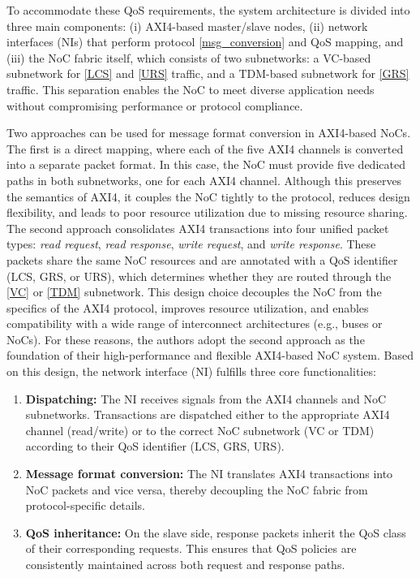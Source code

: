 To accommodate these QoS requirements, the system architecture is divided into three main components: (i) AXI4-based master/slave nodes, (ii) network interfaces (NIs) that perform protocol \ref{msg_conversion} and QoS mapping, and (iii) the NoC fabric itself, which consists of two subnetworks: a VC-based subnetwork for \ref{LCS} and \ref{URS} traffic, and a TDM-based subnetwork for \ref{GRS} traffic. 
This separation enables the NoC to meet diverse application needs without compromising performance or protocol compliance.


\label{msg_conversion}
Two approaches can be used for message format conversion in AXI4-based NoCs. The first is a direct mapping, where each of the five AXI4 channels is converted into a separate packet format. In this case, the NoC must provide five dedicated paths in both subnetworks, one for each AXI4 channel. Although this preserves the semantics of AXI4, it couples the NoC tightly to the protocol, reduces design flexibility, and leads to poor resource utilization due to missing resource sharing. 
The second approach consolidates AXI4 transactions into four unified packet types: \textit{read request}, \textit{read response}, \textit{write request}, and \textit{write response}. These packets share the same NoC resources and are annotated with a QoS identifier (LCS, GRS, or URS), which determines whether they are routed through the \ref{VC} or \ref{TDM} subnetwork. This design choice decouples the NoC from the specifics of the AXI4 protocol, improves resource utilization, and enables compatibility with a wide range of interconnect architectures (e.g., buses or NoCs).
For these reasons, the authors adopt the second approach as the foundation of their high-performance and flexible AXI4-based NoC system. Based on this design, the network interface (NI) fulfills three core functionalities:
\begin{enumerate}
    \item \textbf{Dispatching:} The NI receives signals from the AXI4 channels and NoC subnetworks. 
    Transactions are dispatched either to the appropriate AXI4 channel (read/write) or to the correct NoC subnetwork (VC or TDM) according to their QoS identifier (LCS, GRS, URS).
    \item \textbf{Message format conversion:} The NI translates AXI4 transactions into NoC packets and vice versa, thereby decoupling the NoC fabric from protocol-specific details.
    \item \textbf{QoS inheritance:} On the slave side, response packets inherit the QoS class of their corresponding requests. 
    This ensures that QoS policies are consistently maintained across both request and response paths.
\end{enumerate}

